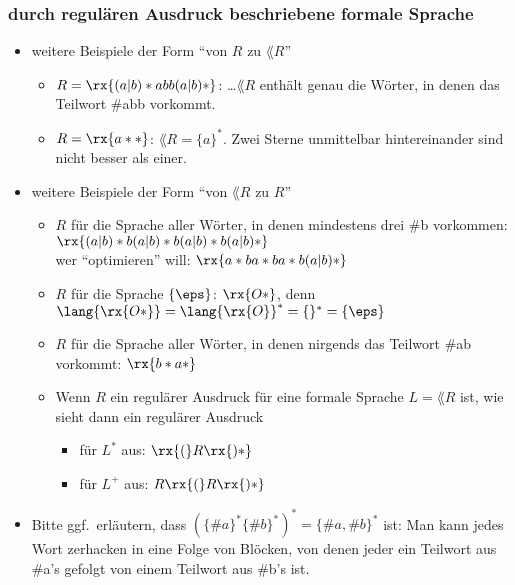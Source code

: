 \begin{tutorium}
  \subsubsection*{durch regulären Ausdruck beschriebene formale Sprache}
  \begin{itemize}
  \item weitere Beispiele der Form "`von $R$ zu $\lang{R}$"'
    \begin{itemize}
    \item $R=\rx{(a|b)*abb(a|b)*}$: \dots $\lang{R}$ enthält genau die
      Wörter, in denen das Teilwort \#{abb} vorkommt.
    \item $R=\rx{a**}$: $\lang{R}=\{a\}^*$. Zwei Sterne unmittelbar
      hintereinander sind nicht besser als einer.
    \end{itemize}
  \item weitere Beispiele der Form "`von $\lang{R}$ zu $R$"'
    \begin{itemize}
    \item $R$ für die Sprache aller Wörter, in denen mindestens drei
      \#b vorkommen:\\
      $\rx{(a|b)*b(a|b)*b(a|b)*b(a|b)*}$\\
      wer "`optimieren"' will: \zB $\rx{a*ba*ba*b(a|b)*}$
    \item $R$ für die Sprache $\{\eps\}$: $\rx{O*}$, denn
      $\lang{\rx{O*}}= \lang{\rx{O}}^* = \{\}^* = \{\eps\}$
    \item $R$ für die Sprache aller Wörter, in denen nirgends das
      Teilwort \#{ab} vorkommt: $\rx{b*a*}$
    \item Wenn $R$ ein regulärer Ausdruck für eine formale Sprache
      $L=\lang{R}$ ist, wie sieht dann ein regulärer Ausdruck 
      \begin{itemize}
      \item für $L^*$ aus: $\rx{(}R\rx{)*}$
      \item für $L^+$ aus: $R\rx{(}R\rx{)*}$
      \end{itemize}
    \end{itemize}
  \item Bitte ggf.\ erläutern, dass $(\{\#a\}^*\{\#b\}^*)^* =
    \{\#a,\#b\}^*$ ist: Man kann jedes Wort zerhacken in eine Folge
    von Blöcken, von denen jeder ein Teilwort aus \#a's gefolgt von
    einem Teilwort aus \#b's ist.
  \end{itemize}
\end{tutorium}

